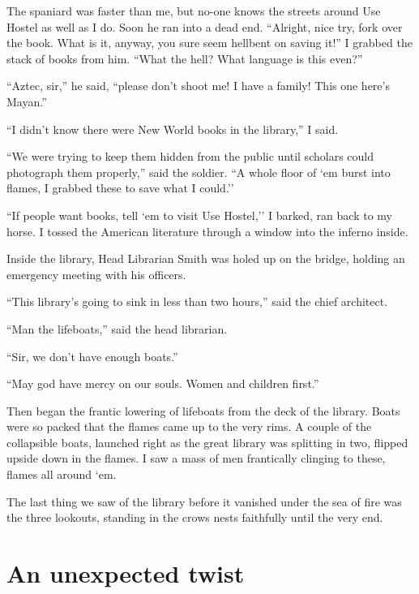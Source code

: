 \documentclass[oneside]{book}
\begin{document}
The spaniard was faster than me, but no-one knows the streets around Use Hostel as well as I do.  Soon he ran into
a dead end.  ``Alright, nice try, fork over the book.  What is it, anyway, you sure seem hellbent on saving it!''
I grabbed the stack of books from him.  ``What the hell?  What language is this even?''

``Aztec, sir,'' he said, ``please don't shoot me!  I have a family!  This one here's Mayan.''

``I didn't know there were New World books in the library,'' I said.

``We were trying to keep them hidden from the public until scholars could photograph them properly,'' said the
soldier.  ``A whole floor of `em burst into flames, I grabbed these to save what I could.''

``If people want books, tell `em to visit Use Hostel,'' I barked, ran back to my horse.  I tossed the American
literature through a window into the inferno inside.

Inside the library, Head Librarian Smith was holed up on the bridge, holding an emergency meeting with his officers.

``This library's going to sink in less than two hours,'' said the chief architect.

``Man the lifeboats,'' said the head librarian.

``Sir, we don't have enough boats.''

``May god have mercy on our souls.  Women and children first.''

Then began the frantic lowering of lifeboats from the deck of the library.  Boats were so packed that the flames
came up to the very rims.  A couple of the collapsible boats, launched right as the great library was splitting in
two, flipped upside down in the flames.  I saw a mass of men frantically clinging to these, flames all around `em.

The last thing we saw of the library before it vanished under the sea of fire was the three lookouts, standing in
the crows nests faithfully until the very end.

\chapter{An unexpected twist}

\end{document}
